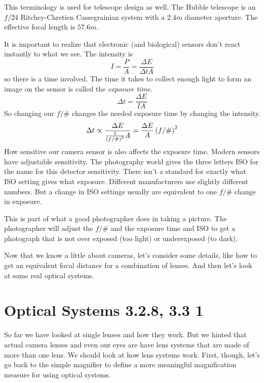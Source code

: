 \documentclass{article}
\begin{document}
This terminology is used for telescope design as well. The Hubble telescope
is an $f/24$ Ritchey-Chretien Cassegrainian system with a $2.4\unit{m}$
diameter aperture. The effective focal length is $57.6\unit{m}$.


It is important to realize that electronic (and biological) sensors don't
react instantly to what we see. The intensity is 
\[
I=\frac{P}{A}=\frac{\Delta E}{\Delta tA}
\]%
so there is a time involved. The time it takes to collect enough light to
form an image on the sensor is called the \emph{exposure time}. 
\[
\Delta t=\frac{\Delta E}{IA}
\]%
So changing our $f/\#$ changes the needed exposure time by changing the
intensity. 
\[
\Delta t\propto \frac{\Delta E}{\frac{1}{\left( f/\#\right) ^{2}}A}=\frac{%
\Delta E}{A}\left( f/\#\right) ^{2}
\]%
How sensitive our camera sensor is also affects the exposure time. Modern
sensors have adjustable sensitivity. The photography world gives the three
letters ISO for the name for this detector sensitivity. There isn't a
standard for exactly what ISO setting gives what exposure. Different
manufacturers use slightly different numbers. But a change in ISO settings
usually are equivalent to one $f/\#$ change in exposure.

This is part of what a good photographer does in taking a picture. The
photographer will adjust the $f/\#$ and the exposure time and ISO to get a
photograph that is not over exposed (too light) or underexposed (to dark).

Now that we know a little about cameras, let's consider some details, like
how to get an equivalent focal distance for a combination of lenses. And
then let's look at some real optical systems.

\section{Optical Systems 3.2.8, 3.3 1}

So far we have looked at single lenses and how they work. But we hinted that
actual camera lenses and even our eyes are have lens systems that are made
of more than one lens. We should look at how lens systems work. First,
though, let's go back to the simple magnifier to define a more meaningful
magnification measure for using optical systems.
\end{document}
